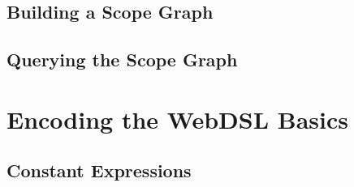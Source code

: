     \subsection{Building a Scope Graph}
    \subsection{Querying the Scope Graph}





  
  \section{\label{sec:simple-type-systems}Encoding the WebDSL Basics}

    \subsection{\label{subsec:simple-constants}Constant Expressions}

